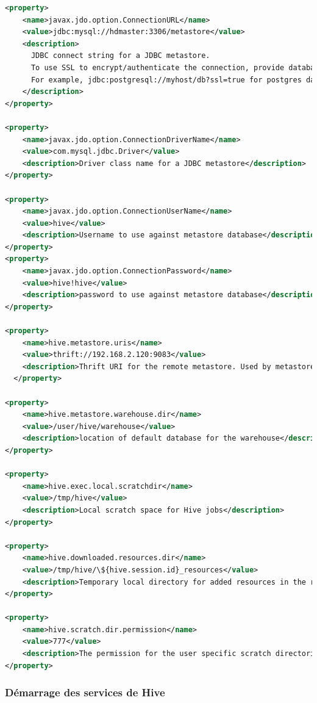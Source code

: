 \documentclass[12pt,french]{book}
\begin{document}
\begin{lstlisting}[language=XML, frame=single, breaklines=true, postbreak=\mbox{\textcolor{red}{$\hookrightarrow$}\space}]
<property>
    <name>javax.jdo.option.ConnectionURL</name>
    <value>jdbc:mysql://hdmaster:3306/metastore</value>
    <description>
      JDBC connect string for a JDBC metastore.
      To use SSL to encrypt/authenticate the connection, provide database-specific SSL flag in the connection URL.
      For example, jdbc:postgresql://myhost/db?ssl=true for postgres database.
    </description>
</property>

<property>
    <name>javax.jdo.option.ConnectionDriverName</name>
    <value>com.mysql.jdbc.Driver</value>
    <description>Driver class name for a JDBC metastore</description>
</property>

<property>
    <name>javax.jdo.option.ConnectionUserName</name>
    <value>hive</value>
    <description>Username to use against metastore database</description>
</property>
<property>
    <name>javax.jdo.option.ConnectionPassword</name>
    <value>hive!hive</value>
    <description>password to use against metastore database</description>
</property>

<property>
    <name>hive.metastore.uris</name>
    <value>thrift://192.168.2.120:9083</value>
    <description>Thrift URI for the remote metastore. Used by metastore client to connect to remote metastore.</description>
  </property>

<property>
    <name>hive.metastore.warehouse.dir</name>
    <value>/user/hive/warehouse</value>
    <description>location of default database for the warehouse</description>
</property>

<property>
    <name>hive.exec.local.scratchdir</name>
    <value>/tmp/hive</value>
    <description>Local scratch space for Hive jobs</description>
</property>

<property>
    <name>hive.downloaded.resources.dir</name>
    <value>/tmp/hive/\${hive.session.id}_resources</value>
    <description>Temporary local directory for added resources in the remote file system.</description>
</property>

<property>
    <name>hive.scratch.dir.permission</name>
    <value>777</value>
    <description>The permission for the user specific scratch directories that get created.</description>
</property>
\end{lstlisting}


\subsubsection{Démarrage des services de Hive}
\end{document}
